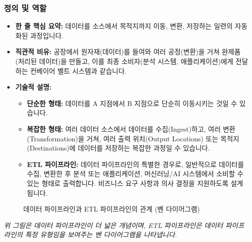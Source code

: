 \documentclass[11pt,a4paper]{article}
\theoremstyle{definition}
\begin{document}
\subsubsection{정의 및 역할}
\begin{itemize}
    \item \textbf{한 줄 핵심 요약:} 데이터를 소스에서 목적지까지 이동, 변환, 저장하는 일련의 자동화된 과정입니다.
    \item \textbf{직관적 비유:} 공장에서 원자재(데이터)를 들여와 여러 공정(변환)을 거쳐 완제품(처리된 데이터)을 만들고, 이를 최종 소비자(분석 시스템, 애플리케이션)에게 전달하는 컨베이어 벨트 시스템과 같습니다.
    \item \textbf{기술적 설명:}
    \begin{itemize}
        \item \textbf{단순한 형태:} 데이터를 A 지점에서 B 지점으로 단순히 이동시키는 것일 수 있습니다.
        \item \textbf{복잡한 형태:} 여러 데이터 소스에서 데이터를 수집(Ingest)하고, 여러 변환(Transformation)을 거쳐, 여러 출력 위치(Output Locations) 또는 목적지(Destinations)에 데이터를 저장하는 복잡한 과정일 수 있습니다.
        \item \textbf{ETL 파이프라인:} 데이터 파이프라인의 특별한 경우로, 일반적으로 데이터를 수집, 변환한 후 분석 또는 애플리케이션, 머신러닝/AI 시스템에서 소비할 수 있는 형태로 출력합니다. 비즈니스 요구 사항과 의사 결정을 지원하도록 설계됩니다.
    \end{itemize}
\end{itemize}

\begin{figure}[htbp]
\centering
\caption{데이터 파이프라인과 ETL 파이프라인의 관계 (벤 다이어그램)}
\label{fig:data_pipeline_etl_venn}
\end{figure}
\textit{위 그림은 데이터 파이프라인이 더 넓은 개념이며, ETL 파이프라인은 데이터 파이프라인의 특정 유형임을 보여주는 벤 다이어그램을 나타냅니다.}
\end{document}
